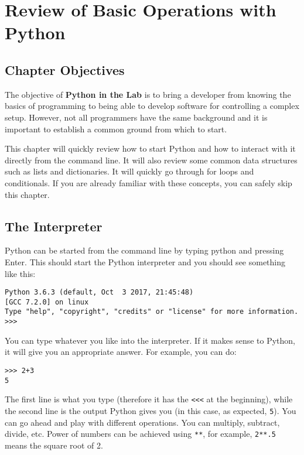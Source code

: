 \chapter{Review of Basic Operations with Python}\label{review-of-basic-operations-withpython}

\section{Chapter Objectives}\label{chapterobjectives}

The objective of \textbf{Python in the Lab} is to bring a developer from
knowing the basics of programming to being able to develop software for
controlling a complex setup. However, not all programmers have the same
background and it is important to establish a common ground from which
to start.

This chapter will quickly review how to start Python and how to interact
with it directly from the command line. It will also review some common
data structures such as lists and dictionaries. It will quickly go
through for loops and conditionals. If you are already familiar with
these concepts, you can safely skip this chapter.

\section{The Interpreter}\label{theinterpreter}
Python can be started from the command line by typing python and
pressing Enter. This should start the Python interpreter and you should
see something like this:

\begin{verbatim}
Python 3.6.3 (default, Oct  3 2017, 21:45:48)
[GCC 7.2.0] on linux
Type "help", "copyright", "credits" or "license" for more information.
>>>
\end{verbatim}

You can type whatever you like into the interpreter. If it makes sense
to Python, it will give you an appropriate answer. For example, you
can do:

\begin{verbatim}
>>> 2+3
5
\end{verbatim}

The first line is what you type (therefore it has the
\texttt{<<<} at the beginning),
while the second line is the output Python gives you (in this case, as
expected, \texttt{5}). You can go ahead and play with different
operations. You can multiply, subtract, divide, etc. Power of numbers
can be achieved using \texttt{**}, for example, \texttt{2**.5} means the
square root of 2.

